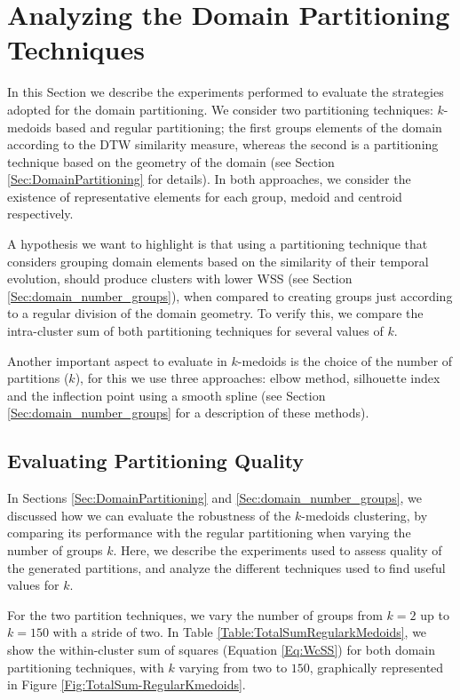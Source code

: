 \section{Analyzing the Domain Partitioning Techniques}
\label{Sec:AnalyzeDomainPartitioning}

In this Section we describe the experiments performed to evaluate the strategies adopted for the domain partitioning. We consider two partitioning techniques: $k$-medoids based and regular partitioning; the first groups elements of the domain according to the DTW similarity measure, whereas the second is a partitioning technique based on the geometry of the domain (see Section \ref{Sec:DomainPartitioning} for details). In both approaches, we consider the existence of representative elements for each group, medoid and centroid respectively.

A hypothesis we want to highlight is that using a partitioning technique that considers grouping domain elements based on the similarity of their temporal evolution, should produce clusters with lower WSS (see Section \ref{Sec:domain_number_groups}), when compared to creating groups just according to a regular division of the domain geometry. To verify this, we compare the intra-cluster sum of both partitioning techniques for several values of $k$.

Another important aspect to evaluate in $k$-medoids is the choice of the number of partitions ($k$), for this we use three approaches: elbow method, silhouette index and the inflection point using a smooth spline (see Section \ref{Sec:domain_number_groups} for a description of these methods).

\subsection{Evaluating Partitioning Quality}
\label{Sec:EvaluatingPP}

In Sections \ref{Sec:DomainPartitioning} and \ref{Sec:domain_number_groups}, we discussed how we can evaluate the robustness of the $k$-medoids clustering, by comparing its performance with the regular partitioning when varying the number of groups $k$. Here, we describe the experiments used to assess quality of the generated partitions, and analyze the different techniques used to find useful values for $k$.  

For the two partition techniques, we vary the number of groups from $k=2$ up to $k=150$ with a stride of two. In Table \ref{Table:TotalSumRegularkMedoids}, we show the within-cluster sum of squares (Equation \ref{Eq:WcSS}) for both domain partitioning techniques, with $k$ varying from two to $150$, graphically represented in Figure \ref{Fig:TotalSum-RegularKmedoids}. 

